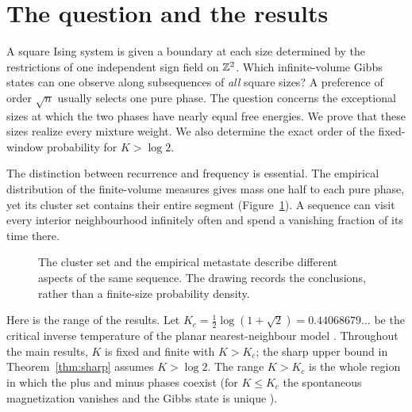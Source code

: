 \section{The question and the results}\label{sec:intro}
A square Ising system is given a boundary at each size determined by the restrictions of one independent sign field on $\mathbb Z^2$. Which infinite-volume Gibbs states can one observe along subsequences of \emph{all} square sizes? A preference of order $\sqrt n$ usually selects one pure phase. The question concerns the exceptional sizes at which the two phases have nearly equal free energies. We prove that these sizes realize every mixture weight. We also determine the exact order of the fixed-window probability for $K>\log2$.

The distinction between recurrence and frequency is essential. The empirical distribution of the finite-volume measures gives mass one half to each pure phase, yet its cluster set contains their entire segment (Figure~\ref{fig:segment}). A sequence can visit every interior neighbourhood infinitely often and spend a vanishing fraction of its time there.

\begin{figure}[ht]
\centering
{}
\caption{The cluster set and the empirical metastate describe different aspects of the same sequence. The drawing records the conclusions, rather than a finite-size probability density.}\label{fig:segment}
\end{figure}

Here is the range of the results. Let $K_c=\tfrac12\log(1+\sqrt2)=0.44068679\ldots$ be the critical inverse temperature of the planar nearest-neighbour model \cite{KW41,Onsager44}. Throughout the main results, $K$ is fixed and finite with $K>K_c$; the sharp upper bound in Theorem~\ref{thm:sharp} assumes $K>\log2$. The range $K>K_c$ is the whole region in which the plus and minus phases coexist (for $K\le K_c$ the spontaneous magnetization vanishes \cite{Yang52,BGJS73} and the Gibbs state is unique \cite{LML72}).


